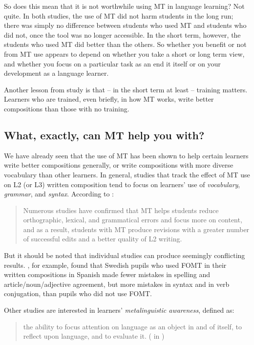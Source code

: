 \documentclass[output=paper,colorlinks,citecolor=brown,
]{langscibook}
\begin{document}
So does this mean that it is not worthwhile using MT in language learning? Not quite. In both studies, the use of MT did not harm students in the long run; there was simply no difference between students who used MT and students who did not, once the tool was no longer accessible. In the short term, however, the students who used MT did better than the others. So whether you benefit or not from MT use appears to depend on whether you take a short or long term view, and whether you focus on a particular task as an end it itself or on your development as a language learner.

Another lesson from  study is that – in the short term at least – training matters. Learners who are trained, even briefly, in how MT works, write better compositions than those with no training.

\subsection{What, exactly, can MT help you with?}

We have already seen that the use of MT has been shown to help certain learners write better compositions generally, or write compositions with more diverse vocabulary than other learners. In general, studies that track the effect of MT use on L2 (or L3) written composition tend to focus on learners’ use of \textit{vocabulary}, \textit{grammar}, and \textit{syntax}. According to \citet{Lee2021}:

\begin{quote}
Numerous studies have confirmed that MT helps students reduce orthographic, lexical, and grammatical errors and focus more on content, and as a result, students with MT produce revisions with a greater number of successful edits and a better quality of L2 writing. \citep[4]{Lee2021}
\end{quote}

But it should be noted that individual studies can produce seemingly conflicting results. \citet{Fredholm2015}, for example, found that Swedish pupils who used FOMT in their written compositions in Spanish made fewer mistakes in spelling and article/noun/adjective agreement, but more mistakes in syntax and in verb conjugation, than pupils who did not use FOMT. 

Other studies are interested in learners’ \textit{metalinguistic awareness}, defined as:

\begin{quote}
 {the ability to focus attention on language as an object in and of itself, to reflect upon language, and to evaluate it. (\citet[531]{Thomas1988} in \citealt[67]{ThueVold2018})}
\end{quote}
\end{document}
